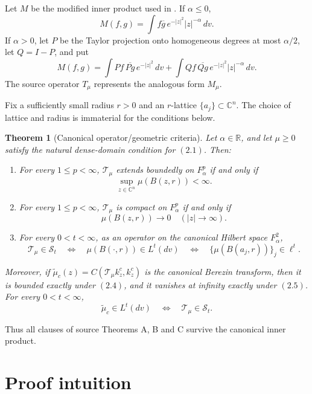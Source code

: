 \documentclass[11pt]{article}
\newtheorem{theorem}{Theorem}
\newcommand{\Cn}{\mathbb C^n}
\newcommand{\Fc}[2]{F^{#1}_{#2}}
\newcommand{\Sc}{\mathcal S}
\newcommand{\Tc}{\mathcal T}
\newcommand{\Tm}{T}
\begin{document}
Let \(M\) be the modified inner product used in \cite{CIJ}.  If
\(\alpha\leq0\),
\[
 M(f,g)=\int f\overline g\,e^{-|z|^2}|z|^{-\alpha}\,dv.
\]
If \(\alpha>0\), let \(P\) be the Taylor projection onto homogeneous
degrees at most \(\alpha/2\), let \(Q=I-P\), and put
\[
 M(f,g)=\int Pf\,\overline{Pg}\,e^{-|z|^2}\,dv
 +\int Qf\,\overline{Qg}\,e^{-|z|^2}|z|^{-\alpha}\,dv.           \tag{2.3}
\]
The source operator \(\Tm_\mu\) represents the analogous form \(M_\mu\).

Fix a sufficiently small radius \(r>0\) and an \(r\)-lattice
\(\{a_j\}\subset\Cn\).  The choice of lattice and radius is immaterial for
the conditions below.

\begin{theorem}[Canonical operator/geometric criteria]\label{thm:main}
Let \(\alpha\in\mathbb R\), and let \(\mu\geq0\) satisfy the natural
dense-domain condition for \((2.1)\).  Then:
\begin{enumerate}
\item For every \(1\leq p<\infty\), \(\Tc_\mu\) extends boundedly on
\(\Fc p\alpha\) if and only if
\[
 \sup_{z\in\Cn}\mu(B(z,r))<\infty.                                \tag{2.4}
\]
\item For every \(1\leq p<\infty\), \(\Tc_\mu\) is compact on
\(\Fc p\alpha\) if and only if
\[
 \mu(B(z,r))\longrightarrow0\quad (|z|\to\infty).                 \tag{2.5}
\]
\item For every \(0<t<\infty\), as an operator on the canonical Hilbert
space \(\Fc2\alpha\),
\[
 \Tc_\mu\in\Sc_t
 \quad\Longleftrightarrow\quad
 \mu(B(\mathord\cdot,r))\in L^t(dv)
 \quad\Longleftrightarrow\quad
 \{\mu(B(a_j,r))\}_j\in\ell^t.                                   \tag{2.6}
\]
\end{enumerate}
Moreover, if \(\widetilde\mu_c(z)=C(\Tc_\mu k^c_z,k^c_z)\) is the
canonical Berezin transform, then it is bounded exactly under \((2.4)\), and
it vanishes at infinity exactly under \((2.5)\).  For every \(0<t<\infty\),
\[
 \widetilde\mu_c\in L^t(dv)\quad\Longleftrightarrow\quad
 \Tc_\mu\in\Sc_t.                                                  \tag{2.7}
\]
\end{theorem}

Thus all clauses of source Theorems A, B and C survive the canonical inner
product.

\section{Proof intuition}
\end{document}
